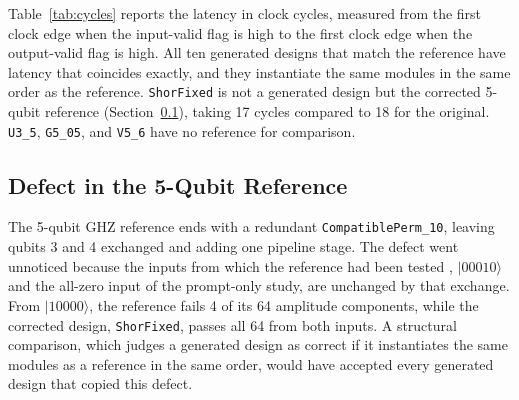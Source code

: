 \documentclass[conference]{IEEEtran}
\begin{document}



Table~\ref{tab:cycles} reports the latency in clock cycles, measured from
the first clock edge when the input-valid flag is high to the first clock
edge when the output-valid flag is high. All ten generated designs that match the reference have latency
 that coincides exactly, and they instantiate the same modules
in the same order as the reference. \texttt{ShorFixed} is not a generated
design but the corrected 5-qubit reference (Section~\ref{subsec:defects}),
 taking 17 cycles compared to 18 for the original.
\texttt{U3\_5}, \texttt{G5\_05}, and \texttt{V5\_6} have no reference for
 comparison.



\subsection{Defect in the 5-Qubit Reference}
\label{subsec:defects}
The 5-qubit GHZ reference ends with a redundant \texttt{CompatiblePerm\_10},
 leaving qubits 3 and 4 exchanged and adding one pipeline stage. The
defect went unnoticed because the inputs from which the reference had been tested
, $|00010\rangle$ and the all-zero input of the prompt-only study, are
unchanged by that exchange. From $|10000\rangle$, the reference fails 4 of
its 64 amplitude components, while the corrected design,
\texttt{ShorFixed}, passes all 64 from both inputs. A structural
comparison, which judges a generated design as correct if it instantiates the
same modules as a reference in the same order, would have accepted every
generated design that copied this defect.
\end{document}
